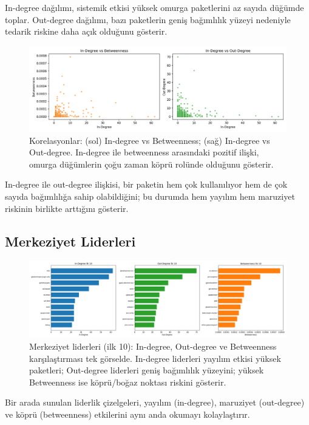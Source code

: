\documentclass[11pt,a4paper]{article}
\begin{document}
\noindent In-degree dağılımı, sistemik etkisi yüksek omurga paketlerini az sayıda düğümde toplar. Out-degree dağılımı, bazı paketlerin geniş bağımlılık yüzeyi nedeniyle tedarik riskine daha açık olduğunu gösterir.

\begin{figure}[H]
  \centering
  \includegraphics{scatter_correlations.png}
  \caption{Korelasyonlar: (sol) In-degree vs Betweenness; (sağ) In-degree vs Out-degree. In-degree ile betweenness arasındaki pozitif ilişki, omurga düğümlerin çoğu zaman köprü rolünde olduğunu gösterir.}
\end{figure}

\noindent In-degree ile out-degree ilişkisi, bir paketin hem çok kullanılıyor hem de çok sayıda bağımlılığa sahip olabildiğini; bu durumda hem yayılım hem maruziyet riskinin birlikte arttığını gösterir.

\subsection{Merkeziyet Liderleri}
\begin{figure}[H]
  \centering
  \includegraphics{top10_leaders.png}
  \caption{Merkeziyet liderleri (ilk 10): In-degree, Out-degree ve Betweenness karşılaştırması tek görselde. In-degree liderleri yayılım etkisi yüksek paketleri; Out-degree liderleri geniş bağımlılık yüzeyini; yüksek Betweenness ise köprü/boğaz noktası riskini gösterir.}
\end{figure}

\noindent Bir arada sunulan liderlik çizelgeleri, yayılım (in-degree), maruziyet (out-degree) ve köprü (betweenness) etkilerini aynı anda okumayı kolaylaştırır.
\end{document}
